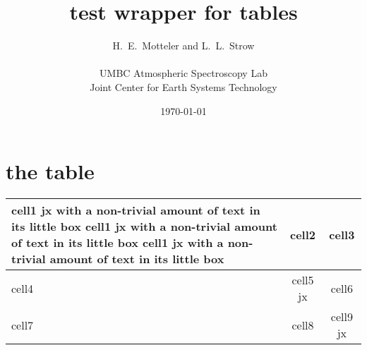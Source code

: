 \documentclass[12pt]{article}
\title{test wrapper for tables}
\author{H.~E.~Motteler and L.~L.~Strow \\
  \\
  UMBC Atmospheric Spectroscopy Lab \\
  Joint Center for Earth Systems Technology \\
}
\date{\today}
\begin{document}
\maketitle

\section{the table}

\begin{center}
\begin{tabularx}{\textwidth}{ |X|c|c| }
\hline
 cell1 jx with a non-trivial amount of text in its little box 
 cell1 jx with a non-trivial amount of text in its little box 
 cell1 jx with a non-trivial amount of text in its little box 
 & cell2 & cell3 \\ 
\hline
 cell4 & cell5 jx & cell6 \\  
\hline
 cell7 & cell8 & cell9 jx \\
\hline
\end{tabularx}
\end{center}
\end{document}
